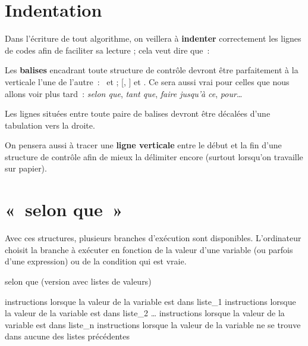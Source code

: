 \section{Indentation}
	
	Dans l’écriture de tout algorithme, on veillera à \textbf{indenter}
	correctement les lignes de codes afin de faciliter sa lecture ; cela
	veut dire que~:
	
	\begin{liste}
	\item
		Les \textbf{balises} encadrant toute structure de contrôle 
		devront être parfaitement à la verticale l’une de l’autre~:~
		 et  ; 
		 [, ] 
		et .
		Ce sera aussi vrai pour celles que nous allons voir plus tard~: 
		\emph{selon que}, \emph{tant que}, \emph{faire jusqu’à ce},
		\emph{pour}\dots	
	\item
		Les lignes situées entre toute paire de balises 
		devront être décalées d’une tabulation vers la droite.
	\item
		On pensera aussi à tracer une \textbf{ligne verticale} 
		entre le début et la fin d’une structure de contrôle 
		afin de mieux la délimiter encore 
		(surtout lorsqu’on travaille sur papier).
	\end{liste}
	
	\section{«~selon que~»}
	
	Avec ces structures, plusieurs branches d’exécution
	sont disponibles. L’ordinateur choisit la branche à
	exécuter en fonction de la valeur d’une variable 
	(ou parfois d’une expression) ou de
	la condition qui est vraie.
	
	\begin{Emphase}[definition]{selon que (version avec listes de valeurs)}

	\begin{Pseudocode}
				\LComment instructions lorsque la valeur de la variable est dans liste\_1
				\LComment instructions lorsque la valeur de la variable est dans liste\_2		
			\Empty \dots
				\LComment instructions lorsque la valeur de la variable est dans liste\_n
				\LComment instructions lorsque la valeur de la variable 
				\LComment ne se trouve dans aucune des listes précédentes
		\EndSwitch
	\end{Pseudocode}

	\end{Emphase}
	
